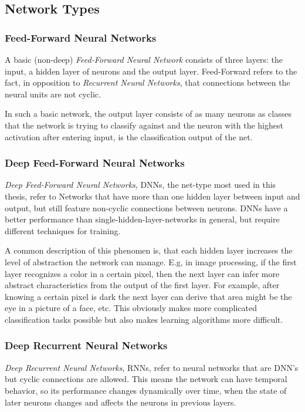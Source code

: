 \subsection{Network Types}
\label{sec:fund:types}

\subsubsection{Feed-Forward Neural Networks}
A basic (non-deep) \textit{Feed-Forward Neural Network} consists of three layers: the input, a hidden layer of neurons and the output layer. Feed-Forward refers to the fact, in opposition to \textit{Recurrent Neural Networks}, that connections between the neural units are not cyclic. 

In such a basic network, the output layer consists of as many neurons as classes that the network is trying to classify against and the neuron with the highest activation after entering input, is the classification output of the net.

\subsubsection{Deep Feed-Forward Neural Networks}
\textit{Deep Feed-Forward Neural Networks}, DNNs, the net-type most used in this thesis, refer to Networks that have more than one hidden layer between input and output, but still feature non-cyclic connections between neurons. DNNs have a better performance than single-hidden-layer-networks in general, but require different techniques for training. 

A common description of this phenomen is, that each hidden layer increases the level of abstraction the network can manage. E.g, in image processing, if the first layer recognizes a color in a certain pixel, then the next layer can infer more abstract characteristics from the output of the first layer. For example, after knowing a certain pixel is dark the next layer can derive that area might be the eye in a picture of a face, etc. This obviously makes more complicated classification tasks possible but also makes learning algorithms more difficult.

\subsubsection{Deep Recurrent Neural Networks}
\textit{Deep Recurrent Neural Networks}, RNNs, refer to neural networks that are DNN's but cyclic connections are allowed. This means the network can have temporal behavior, so its performance changes dynamically over time, when the state of later neurons changes and affects the neurons in previous layers.

